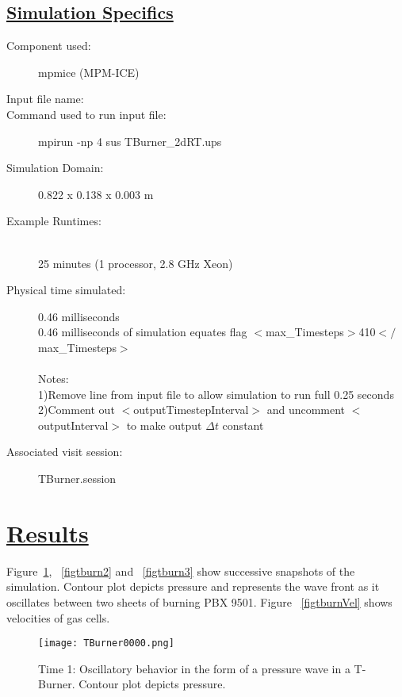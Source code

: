 \subsection*{\underline{Simulation Specifics}}
\begin{description}
\item [Component used:] \hfill mpmice (MPM-ICE)
\item [Input file name:] \hfill {}
\item [Command used to run input file:]\hfill mpirun -np 4 sus TBurner\_2dRT.ups

\item [Simulation Domain:]\hfill    0.822 x 0.138 x 0.003 m

\item [Example Runtimes:] \hfill \\
 25 minutes   (1 processor, 2.8 GHz Xeon)\\

\item [Physical time simulated:] \hfill 0.46 milliseconds \\ 
0.46 milliseconds of simulation equates flag $<$max\_Timesteps$>$410$</$max\_Timesteps$>$ \\ \\
Notes: \\
1)Remove line from input file to allow simulation to run full 0.25 seconds \\
2)Comment out $<$outputTimestepInterval$>$ and uncomment $<$outputInterval$>$ to make output $\Delta t$ constant \\ 

\item [Associated visit session:] \hfill TBurner.session

\end{description}

\newpage

\section*{\underline{Results}}

Figure~\ref{figtburn1}, ~\ref{figtburn2} and ~\ref{figtburn3} show successive snapshots of the simulation.  Contour plot depicts pressure and represents the wave front as it oscillates between two sheets of burning PBX 9501.  Figure ~\ref{figtburnVel} shows velocities of gas cells.
\begin{figure}
  \center
  \texttt{[image: TBurner0000.png]}

  \caption{Time 1: Oscillatory behavior in the form of a pressure wave in a T-Burner.  Contour plot depicts pressure.}
  \label{figtburn1}
\end{figure}

